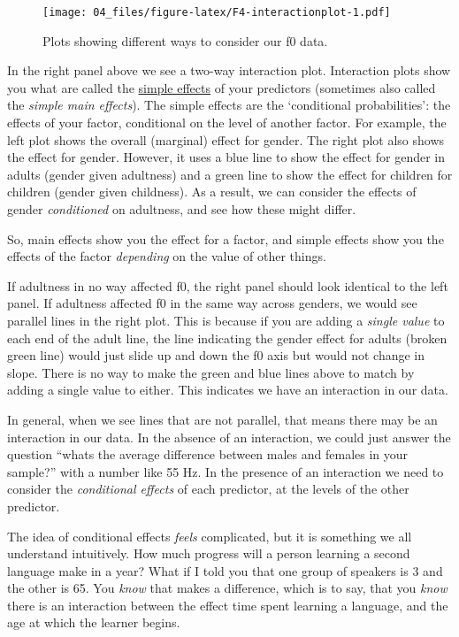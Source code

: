 \documentclass[
]{book}
\begin{document}
\begin{figure}
\centering
\texttt{[image: 04\_files/figure-latex/F4-interactionplot-1.pdf]}
\caption{\label{fig:F4-interactionplot}Plots showing different ways to consider our f0 data.}
\end{figure}

In the right panel above we see a two-way interaction plot. Interaction plots show you what are called the \href{http://glimo.vub.ac.be/downloads/simpleeffect.htm}{simple effects} of your predictors (sometimes also called the \emph{simple main effects}). The simple effects are the `conditional probabilities': the effects of your factor, conditional on the level of another factor. For example, the left plot shows the overall (marginal) effect for gender. The right plot also shows the effect for gender. However, it uses a blue line to show the effect for gender in adults (gender given adultness) and a green line to show the effect for children for children (gender given childness). As a result, we can consider the effects of gender \emph{conditioned} on adultness, and see how these might differ.

So, main effects show you the effect for a factor, and simple effects show you the effects of the factor \emph{depending} on the value of other things.

If adultness in no way affected f0, the right panel should look identical to the left panel. If adultness affected f0 in the same way across genders, we would see parallel lines in the right plot. This is because if you are adding a \emph{single value} to each end of the adult line, the line indicating the gender effect for adults (broken green line) would just slide up and down the f0 axis but would not change in slope. There is no way to make the green and blue lines above to match by adding a single value to either. This indicates we have an interaction in our data.

In general, when we see lines that are not parallel, that means there may be an interaction in our data. In the absence of an interaction, we could just answer the question ``whats the average difference between males and females in your sample?'' with a number like 55 Hz. In the presence of an interaction we need to consider the \emph{conditional effects} of each predictor, at the levels of the other predictor.

The idea of conditional effects \emph{feels} complicated, but it is something we all understand intuitively. How much progress will a person learning a second language make in a year? What if I told you that one group of speakers is 3 and the other is 65. You \emph{know} that makes a difference, which is to say, that you \emph{know} there is an interaction between the effect time spent learning a language, and the age at which the learner begins.
\end{document}
